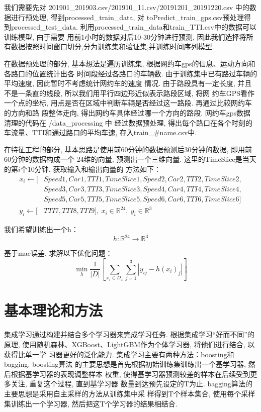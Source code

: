 \documentclass[a4paper,UTF8]{article}
\begin{document}
我们需要先对 201901\_201903.csv/201910\_11.csv/20191201\_20191220.csv 中的数据进行预处理, 得到processed\_train\_data, 对
toPredict\_train\_gps.csv预处理得到processed\_test\_data. 利用processed\_train\_data和train\_TTI.csv中的数据可以训练模型, 由于需要
用前1小时的数据对后10-30分钟进行预测, 因此我们选择将所有数据按照时间窗口切分,分为训练集和验证集,并训练时间序列模型. 

在数据预处理的部分, 基本想法是遍历训练集, 根据网约车gps的信息、运动方向和各路口的位置统计出各
时间段经过各路口的车辆数. 由于训练集中已有路过车辆的平均速度, 因此暂时不考虑统计网约车的速度
情况. 由于路段具有一定长度, 并且不是一条直的线段, 所以我们用平行四边形近似表示路段区域, 将网
约车GPS看作一个点的坐标, 用点是否在区域中判断车辆是否经过这一路段. 再通过比较网约车的方向和路
段整体走向, 得出网约车具体经过哪一个方向的路段. 网约车gps数据清理的代码在 /data\_processing 中
经过数据预处理, 得出每个路口在各个时刻的车流量、TTI和通过路口的平均车速, 存入train\_\#name.csv中. 

在特征工程的部分, 基本思路是使用前60分钟的数据预测后30分钟的数据, 即用前60分钟的数据构成一个
24维的向量, 预测出一个三维向量. 这里的TimeSlice是当天的第$i$个10分钟. 获取输入和输出向量的
方法如下：
$$
\begin{aligned}
  x_i \leftarrow [&Speed1, Car1, TTI1, TimeSlice1, Speed2, Car2, TTI2, TimeSlice2,\\
  &Speed3, Car3, TTI3, TimeSlice3, Speed4, Car4, TTI4, TimeSlice4,\\
  &Speed5, Car5, TTI5, TimeSlice5, Speed6, Car6, TTI6, TimeSlice6]\\
	y_i \leftarrow [&TTI7,TTI8,TTI9],\ x_i \in \mathbb{R}^{24},\ y_i \in \mathbb{R}^3
\end{aligned}
$$

我们希望训练出一个h：
$$h:\mathbb{R}^{24} \rightarrow \mathbb{R}^3$$

基于mae误差, 求解以下优化问题：
$$\min _{h}\dfrac{1}{|D|}\left[\sum_{x_{i} \in D_x}\sum_{j=1}^3 | y_{ij}-h(x_i)_j | \right]$$

\section{基本理论和方法}
集成学习通过构建并结合多个学习器来完成学习任务. 根据集成学习“好而不同”的原理, 
使用随机森林、XGBoost、LightGBM作为个体学习器, 将他们进行结合, 以获得比单一学
习器更好的泛化能力. 集成学习主要有两种方法：boosting和bagging. boosting算法
的主要思想是首先根据初始训练集训练出一个基学习器, 然后根据基学习器的表现调整样本
权重, 使得基学习器预测较差的样本在后续受到更多关注, 重复这个过程, 直到基学习器
数量到达预先设定的T为止. bagging算法的主要思想是采用自主采样的方法从训练集中采
样得到T个样本集合, 使用每个采样集训练出一个学习器, 然后把这T个学习器的结果相结合. 
\end{document}
